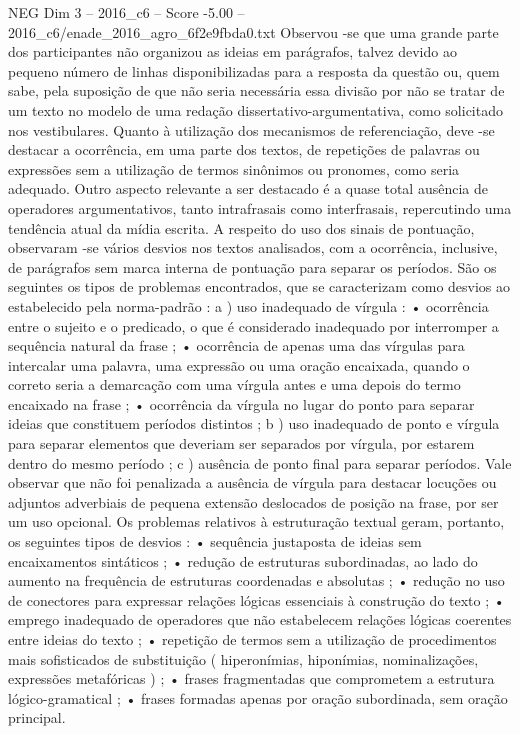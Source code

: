 \begin{textsample}{NEG Dim 3 – 2016\_c6 – Score -5.00 – 2016\_c6/enade\_2016\_agro\_6f2e9fbda0.txt}
Observou -se que uma grande parte dos participantes não organizou as ideias em parágrafos, talvez devido ao pequeno número de linhas disponibilizadas para a resposta da questão ou, quem sabe, pela suposição de que não seria necessária essa divisão por não se tratar de um texto no modelo de uma redação dissertativo-argumentativa, como solicitado nos vestibulares.
Quanto à utilização dos mecanismos de referenciação, deve -se destacar a ocorrência, em uma parte dos textos, de repetições de palavras ou expressões sem a utilização de termos sinônimos ou pronomes, como seria adequado.
Outro aspecto relevante a ser destacado é a quase total ausência de operadores argumentativos, tanto intrafrasais como interfrasais, repercutindo uma tendência atual da mídia escrita.
A respeito do uso dos sinais de pontuação, observaram -se vários desvios nos textos analisados, com a ocorrência, inclusive, de parágrafos sem marca interna de pontuação para separar os períodos.
São os seguintes os tipos de problemas encontrados, que se caracterizam como desvios ao estabelecido pela norma-padrão : a ) uso inadequado de vírgula : • ocorrência entre o sujeito e o predicado, o que é considerado inadequado por interromper a sequência natural da frase ; • ocorrência de apenas uma das vírgulas para intercalar uma palavra, uma expressão ou uma oração encaixada, quando o correto seria a demarcação com uma vírgula antes e uma depois do termo encaixado na frase ; • ocorrência da vírgula no lugar do ponto para separar ideias que constituem períodos distintos ; b ) uso inadequado de ponto e vírgula para separar elementos que deveriam ser separados por vírgula, por estarem dentro do mesmo período ; c ) ausência de ponto final para separar períodos.
Vale observar que não foi penalizada a ausência de vírgula para destacar locuções ou adjuntos adverbiais de pequena extensão deslocados de posição na frase, por ser um uso opcional.
Os problemas relativos à estruturação textual geram, portanto, os seguintes tipos de desvios : • sequência justaposta de ideias sem encaixamentos sintáticos ; • redução de estruturas subordinadas, ao lado do aumento na frequência de estruturas coordenadas e absolutas ; • redução no uso de conectores para expressar relações lógicas essenciais à construção do texto ; • emprego inadequado de operadores que não estabelecem relações lógicas coerentes entre ideias do texto ; • repetição de termos sem a utilização de procedimentos mais sofisticados de substituição ( hiperonímias, hiponímias, nominalizações, expressões metafóricas ) ; • frases fragmentadas que comprometem a estrutura lógico-gramatical ; • frases formadas apenas por oração subordinada, sem oração principal.

\end{textsample}
